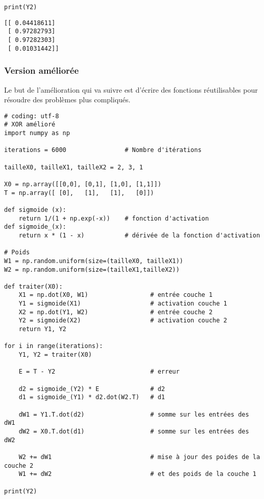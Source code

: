 \documentclass[11pt]{article}
\begin{document}
{\begin{verbatim}
print(Y2)
\end{verbatim}

\begin{verbatim}
[[ 0.04418611]
 [ 0.97282793]
 [ 0.97282303]
 [ 0.01031442]]
\end{verbatim}

\subsubsection{Version améliorée}
\label{sec-4-2-2}

Le but de l'amélioration qui va suivre est d'écrire des fonctions réutilisables
pour résoudre des problèmes plus compliqués.

\begin{verbatim}
# coding: utf-8
# XOR amélioré
import numpy as np

iterations = 6000                # Nombre d'itérations

tailleX0, tailleX1, tailleX2 = 2, 3, 1

X0 = np.array([[0,0], [0,1], [1,0], [1,1]])
T = np.array([ [0],   [1],   [1],   [0]])

def sigmoide (x):
    return 1/(1 + np.exp(-x))    # fonction d'activation
def sigmoide_(x):
    return x * (1 - x)           # dérivée de la fonction d'activation

# Poids
W1 = np.random.uniform(size=(tailleX0, tailleX1))
W2 = np.random.uniform(size=(tailleX1,tailleX2))

def traiter(X0):
    X1 = np.dot(X0, W1)                 # entrée couche 1
    Y1 = sigmoide(X1)                   # activation couche 1
    X2 = np.dot(Y1, W2)                 # entrée couche 2
    Y2 = sigmoide(X2)                   # activation couche 2
    return Y1, Y2

for i in range(iterations):
    Y1, Y2 = traiter(X0)

    E = T - Y2                          # erreur

    d2 = sigmoide_(Y2) * E              # d2  
    d1 = sigmoide_(Y1) * d2.dot(W2.T)   # d1 

    dW1 = Y1.T.dot(d2)                  # somme sur les entrées des dW1
    dW2 = X0.T.dot(d1)                  # somme sur les entrées des dW2

    W2 += dW1                           # mise à jour des poides de la couche 2
    W1 += dW2                           # et des poids de la couche 1

print(Y2)
\end{verbatim}

}
\end{document}
